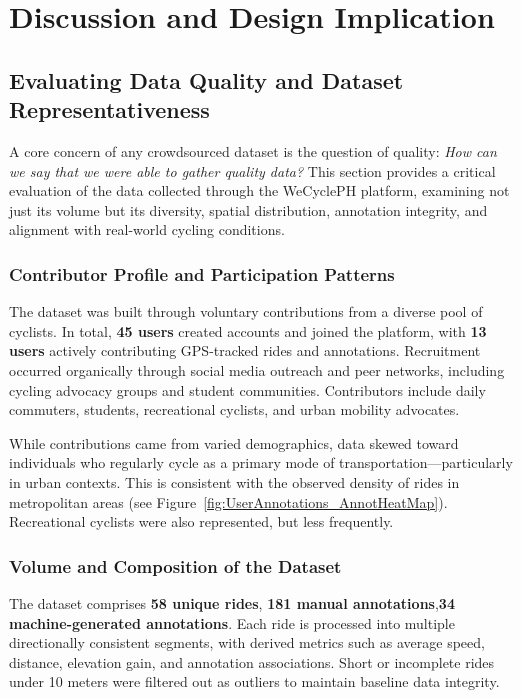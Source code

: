 \section{Discussion and Design Implication}

\subsection{Evaluating Data Quality and Dataset Representativeness}

A core concern of any crowdsourced dataset is the question of quality: \textit{How can we say that we were able to gather quality data?} This section provides a critical evaluation of the data collected through the WeCyclePH platform, examining not just its volume but its diversity, spatial distribution, annotation integrity, and alignment with real-world cycling conditions.

\subsubsection{Contributor Profile and Participation Patterns}

The dataset was built through voluntary contributions from a diverse pool of cyclists. In total, \textbf{45 users} created accounts and joined the platform, with \textbf{13 users} actively contributing GPS-tracked rides and annotations. Recruitment occurred organically through social media outreach and peer networks, including cycling advocacy groups and student communities. Contributors include daily commuters, students, recreational cyclists, and urban mobility advocates.

While contributions came from varied demographics, data skewed toward individuals who regularly cycle as a primary mode of transportation—particularly in urban contexts. This is consistent with the observed density of rides in metropolitan areas (see Figure~\ref{fig:UserAnnotations_AnnotHeatMap}). Recreational cyclists were also represented, but less frequently.

\subsubsection{Volume and Composition of the Dataset}

The dataset comprises \textbf{58 unique rides}, \textbf{181 manual annotations},\textbf{34 machine-generated annotations}. Each ride is processed into multiple directionally consistent segments, with derived metrics such as average speed, distance, elevation gain, and annotation associations. Short or incomplete rides under 10 meters were filtered out as outliers to maintain baseline data integrity.

